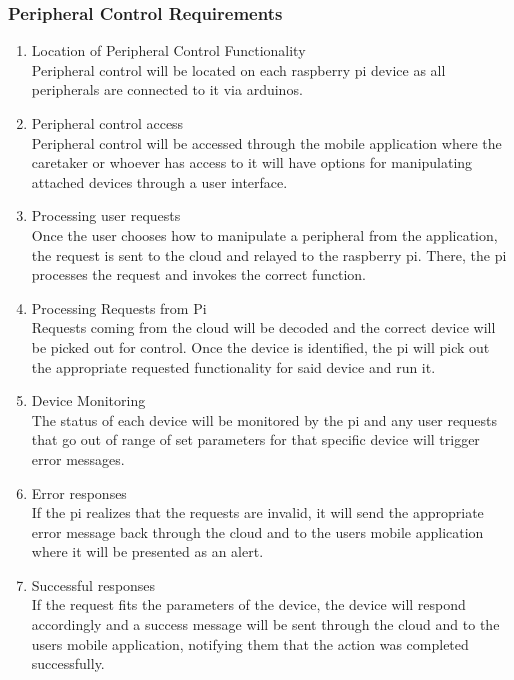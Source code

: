 \subsubsection{Peripheral Control Requirements}
        	\begin{enumerate}
            	\item{Location of Peripheral Control Functionality\\ Peripheral control will be located on each raspberry pi device as all peripherals are connected to it via arduinos.}
            	\item{Peripheral control access\\Peripheral control will be accessed through the mobile application where the caretaker or whoever has access to it will have options for manipulating attached devices through a user interface.}
                \item{Processing user requests\\Once the user chooses how to manipulate a peripheral from the application, the request is sent to the cloud and relayed to the raspberry pi. There, the pi processes the request and invokes the correct function.}
                \item{Processing Requests from Pi\\ Requests coming from the cloud will be decoded and the correct device will be picked out for control. Once the device is identified, the pi will pick out the appropriate requested functionality for said device and run it.}
                \item{Device Monitoring\\The status of each device will be monitored by the pi and any user requests that go out of range of set parameters for that specific device will trigger error messages.}
                \item{Error responses\\If the pi realizes that the requests are invalid, it will send the appropriate error message back through the cloud and to the users mobile application where it will be presented as an alert.}
                \item{Successful responses\\ If the request fits the parameters of the device, the device will respond accordingly and a success message will be sent through the cloud and to the users mobile application, notifying them that the action was completed successfully.}
            \end{enumerate}